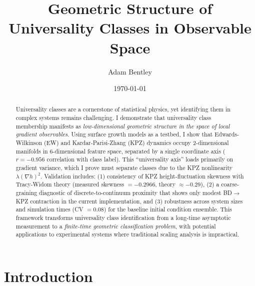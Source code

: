 \documentclass[aps,pre,twocolumn,superscriptaddress,showpacs]{revtex4-2}
\begin{document}
\title{Geometric Structure of Universality Classes in Observable Space}

\author{Adam Bentley}

\date{\today}

\begin{abstract}
Universality classes are a cornerstone of statistical physics, yet identifying them in complex systems remains challenging. I demonstrate that universality class membership manifests as \emph{low-dimensional geometric structure in the space of local gradient observables}. Using surface growth models as a testbed, I show that Edwards-Wilkinson (EW) and Kardar-Parisi-Zhang (KPZ) dynamics occupy 2-dimensional manifolds in 6-dimensional feature space, separated by a single coordinate axis ($r = -0.956$ correlation with class label). This ``universality axis'' loads primarily on gradient variance, which I prove must separate classes due to the KPZ nonlinearity $\lambda(\nabla h)^2$. Validation includes: (1) consistency of KPZ height-fluctuation skewness with Tracy-Widom theory (measured skewness $= -0.2966$, theory $\approx -0.29$), (2) a coarse-graining diagnostic of discrete-to-continuum proximity that shows only modest BD$\to$KPZ contraction in the current implementation, and (3) robustness across system sizes and simulation times (CV $= 0.08$) for the baseline initial condition ensemble. This framework transforms universality class identification from a long-time asymptotic measurement to a \emph{finite-time geometric classification problem}, with potential applications to experimental systems where traditional scaling analysis is impractical.
\end{abstract}


\maketitle

\section{Introduction}
\label{sec:introduction}
\end{document}
